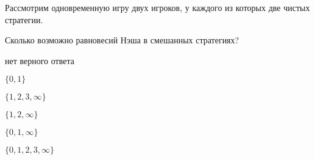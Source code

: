 
\begin{question}
Рассмотрим одновременную игру двух игроков, у каждого из которых две чистых стратегии.

Сколько возможно равновесий Нэша в смешанных стратегиях?
\begin{answerlist}
  \item нет верного ответа
  \item \(\{0, 1\}\)
  \item \(\{1, 2, 3, \infty \}\)
  \item \(\{1, 2, \infty \}\)
  \item \(\{0, 1, \infty \}\)
  \item \(\{0, 1, 2, 3, \infty \}\)
\end{answerlist}
\end{question}


